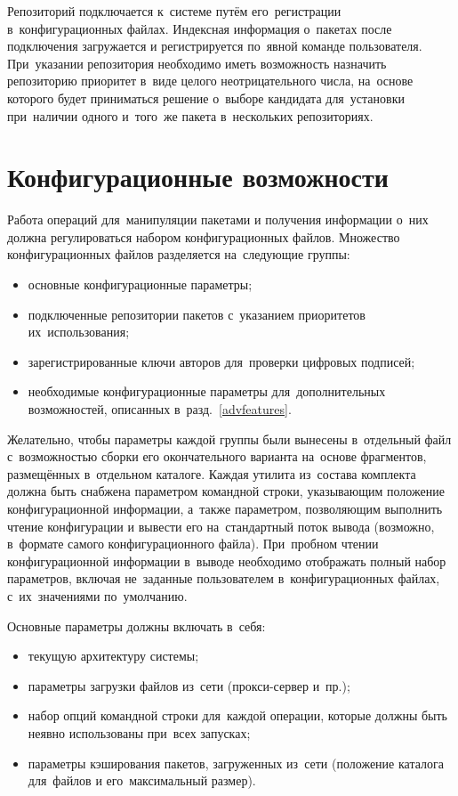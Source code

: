 Репозиторий подключается к~системе путём его~регистрации в~конфигурационных файлах.
Индексная информация о~пакетах после подключения загружается и регистрируется по~явной команде пользователя.
При~указании репозитория необходимо иметь возможность назначить репозиторию приоритет в~виде целого неотрицательного числа,
на~основе которого будет приниматься решение о~выборе кандидата для~установки при~наличии одного и~того~же пакета в~нескольких репозиториях.

\section{Конфигурационные возможности}

Работа операций для~манипуляции пакетами и получения информации о~них должна регулироваться набором конфигурационных файлов.
Множество конфигурационных файлов разделяется на~следующие группы:

\begin{itemize}
\item{основные конфигурационные параметры;}
\item {подключенные репозитории пакетов с~указанием приоритетов их~использования;}
\item {зарегистрированные ключи авторов для~проверки цифровых подписей;}
\item{необходимые конфигурационные параметры для~дополнительных возможностей, описанных в~разд.~\ref{advfeatures}.}
\end{itemize}

Желательно, чтобы параметры каждой группы были вынесены в~отдельный файл с~возможностью 
сборки его окончательного варианта на~основе фрагментов, размещённых в~отдельном каталоге.
Каждая утилита из~состава комплекта должна быть снабжена параметром командной строки,
указывающим положение конфигурационной информации,
а~также параметром, позволяющим выполнить чтение конфигурации и вывести его на~стандартный поток вывода (возможно, в~формате самого конфигурационного файла). 
При~пробном чтении конфигурационной информации в~выводе необходимо    отображать 
полный набор параметров, включая не~заданные пользователем в~конфигурационных файлах, с~их~значениями  по~умолчанию.

Основные параметры должны включать в~себя:

\begin{itemize}
\item {текущую архитектуру системы;}
\item {параметры загрузки файлов из~сети (прокси-сервер и~пр.);}
\item {набор опций командной строки для~каждой операции, которые должны быть неявно использованы при~всех запусках;}
\item {параметры кэширования пакетов, загруженных из~сети (положение каталога для~файлов и его~максимальный размер).}
\end{itemize}
